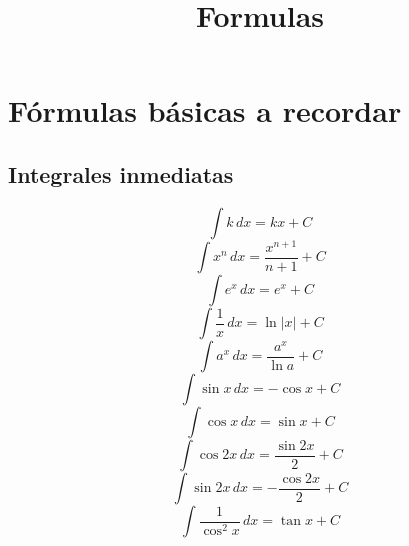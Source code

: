 \documentclass[a4paper,12pt,numbers=noenddot]{scrreprt}
\begin{document}

\title{Formulas}

\section*{Fórmulas básicas a recordar}
\subsection*{Integrales inmediatas}
    \begin{multicols}{2} %
        \begin{equation*}
            \int k \, dx = kx + C
        \end{equation*}
        \begin{equation*}
            \int x^n \, dx = \frac{x^{n+1}}{n+1} + C
        \end{equation*}
        \begin{equation*}
            \int e^x \, dx = e^x + C
        \end{equation*}
        \begin{equation*}
            \int \frac{1}{x} \, dx = \ln |x| + C
        \end{equation*}
        \begin{equation*}
            \int a^x \, dx = \frac{a^x}{\ln a} + C
        \end{equation*}
        \begin{equation*}
            \int \sin x \, dx = -\cos x + C
        \end{equation*}
        \begin{equation*}
            \int \cos x \, dx = \sin x + C
        \end{equation*}
        \begin{equation*}
            \int \cos 2x \, dx = \frac{\sin 2x}{2}  + C
        \end{equation*}
        \begin{equation*}
            \int \sin 2x \, dx = -\frac{\cos 2x}{2} + C 
        \end{equation*}
        \begin{equation*}
            \int \frac{1}{\cos^2 x} \, dx = \tan x + C
        \end{equation*}
        \begin{equation*}

\end{equation*}
\end{multicols}
\end{document}

